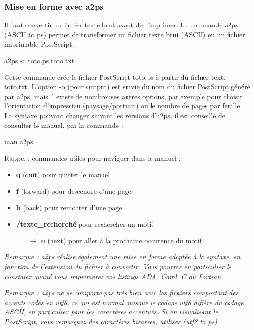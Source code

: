 \documentclass[a4paper,10pt]{article}
\begin{document}
\subsubsection{Mise en forme avec a2ps}

Il faut convertir un fichier texte brut avant de l'imprimer.
La commande a2ps (ASCII to ps) permet de transformer un fichier texte brut
(ASCII) en un fichier imprimable PostScript.

\begin{commandes}
a2ps -o toto.ps toto.txt
\end{commandes}

Cette commande crée le fichier PostScript toto.ps à partir du fichier texte
toto.txt. 
L'option -o (pour \textbf{o}utput) est suivie du nom du fichier PostScript
généré par a2ps, mais il existe de nombreuses autres options, par exemple pour
choisir l'orientation d'impression (paysage/portrait) ou le nombre de pages
par feuille.
La syntaxe pouvant changer suivant les versions d'a2ps, il est conseillé de
consulter le manuel, par la commande :

\begin{commandes}
man a2ps
\end{commandes}

Rappel : commandes utiles pour naviguer dans le manuel :
\begin{itemize}
  \item \textbf{q} (quit) pour quitter le manuel
  \item \textbf{f} (forward) pour descendre d'une page
  \item \textbf{b} (back) pour remonter d'une page
  \item \textbf{/texte\_recherché} pour rechercher un motif
        \begin{itemize}
          \item[\(\rightarrow\)] \textbf{n} (next) pour aller à la prochaine
                                 occurence du motif
        \end{itemize}
\end{itemize}
\vspace{0.3cm}

\emph{Remarque : a2ps réalise également une mise en forme adaptée à la
syntaxe, en fonction de l'extension du fichier à convertir. Vous pourrez en
particulier le constater quand vous imprimerez vos listings ADA, Caml, C ou Fortran.}

\emph{Remarque : a2ps ne se comporte pas très bien avec les fichiers
comportant des accents codés en utf8, ce qui est normal puisque le codage utf8
diffère du codage ASCII, en particulier pour les caractères accentués.
Si en visualisant le PostScript, vous
remarquez des caractères bizarres, utilisez  (utf8 to ps)}
\end{document}

